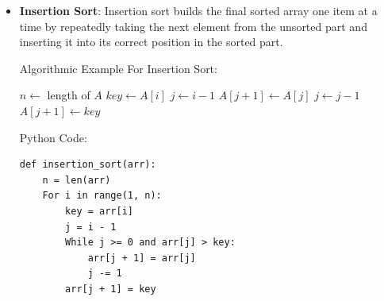 \documentclass[12pt]{book} %
\begin{document}
\begin{itemize}
    Algorithmic Example For Selection Sort:
     \FloatBarrier %
     \begin{algorithm}
\caption{Selection Sort}
\begin{algorithmic}[1]
    \State $n \gets$ length of $A$
        \State $min\_idx \gets i$
                \State $min\_idx \gets j$
            \EndIf
        \EndFor
        \State Swap $A[min\_idx]$ and $A[i]$
    \EndFor
\EndFunction
\end{algorithmic}
\end{algorithm}
\FloatBarrier %
Python Code:
\begin{verbatim}
def selection_sort(arr):
    n = len(arr)
    For i in range(n - 1):
        min_idx = i
        For j in range(i + 1, n):
            If arr[j] < arr[min_idx]:
                min_idx = j
        arr[i], arr[min_idx] = arr[min_idx], arr[i]
\end{verbatim}
\FloatBarrier %
    
    \item \textbf{Insertion Sort}: Insertion sort builds the final sorted array one item at a time by repeatedly taking the next element from the unsorted part and inserting it into its correct position in the sorted part.
    
    Algorithmic Example For Insertion Sort:
     \FloatBarrier %
     \begin{algorithm}
\caption{Insertion Sort}
     \begin{algorithmic}[1]
    \State $n \gets$ length of $A$
        \State $key \gets A[i]$
        \State $j \gets i - 1$
            \State $A[j + 1] \gets A[j]$
            \State $j \gets j - 1$
        \EndWhile
        \State $A[j + 1] \gets key$
    \EndFor
\EndFunction
\end{algorithmic}
\end{algorithm}
\FloatBarrier %
Python Code:
\begin{verbatim}
def insertion_sort(arr):
    n = len(arr)
    For i in range(1, n):
        key = arr[i]
        j = i - 1
        While j >= 0 and arr[j] > key:
            arr[j + 1] = arr[j]
            j -= 1
        arr[j + 1] = key
\end{verbatim}
\FloatBarrier %
    

\end{itemize}
\end{document}
